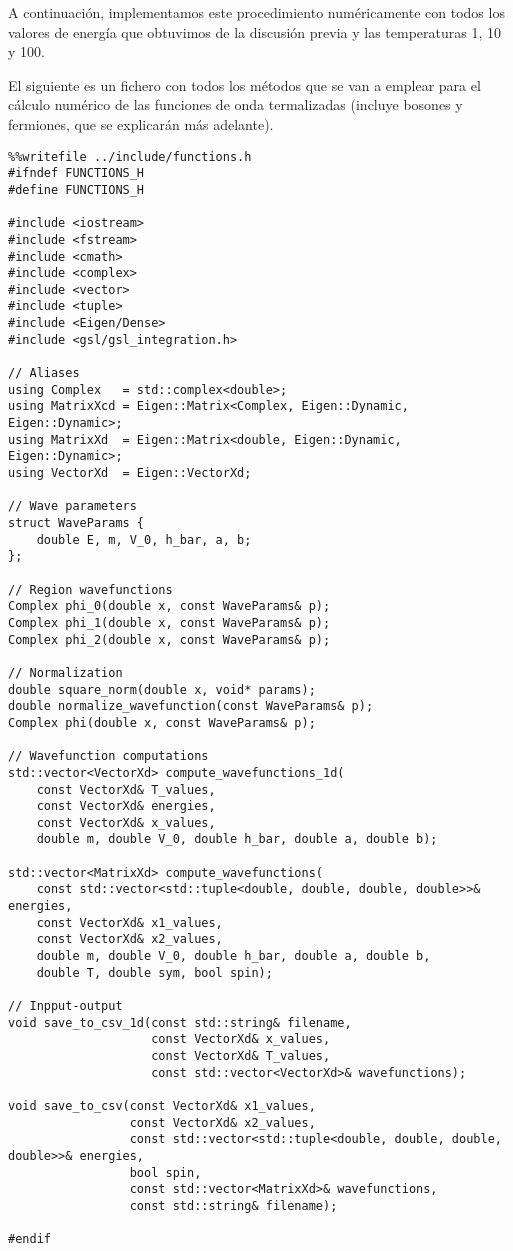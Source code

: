 \documentclass[11pt]{article}
\begin{document}
A continuación, implementamos este procedimiento numéricamente con todos los valores
de energía que obtuvimos de la discusión previa y las temperaturas 1, 10 y 100.

El siguiente es un fichero con todos los métodos que se van a emplear para el cálculo numérico de
las funciones de onda termalizadas (incluye bosones y fermiones, que se
explicarán más adelante).
\begin{verbatim}
%%writefile ../include/functions.h
#ifndef FUNCTIONS_H
#define FUNCTIONS_H

#include <iostream>
#include <fstream>
#include <cmath>
#include <complex>
#include <vector>
#include <tuple>
#include <Eigen/Dense>
#include <gsl/gsl_integration.h>

// Aliases
using Complex   = std::complex<double>;
using MatrixXcd = Eigen::Matrix<Complex, Eigen::Dynamic, Eigen::Dynamic>;
using MatrixXd  = Eigen::Matrix<double, Eigen::Dynamic, Eigen::Dynamic>;
using VectorXd  = Eigen::VectorXd;

// Wave parameters
struct WaveParams {
    double E, m, V_0, h_bar, a, b;
};

// Region wavefunctions
Complex phi_0(double x, const WaveParams& p);
Complex phi_1(double x, const WaveParams& p);
Complex phi_2(double x, const WaveParams& p);

// Normalization
double square_norm(double x, void* params);
double normalize_wavefunction(const WaveParams& p);
Complex phi(double x, const WaveParams& p);

// Wavefunction computations
std::vector<VectorXd> compute_wavefunctions_1d(
    const VectorXd& T_values,
    const VectorXd& energies,
    const VectorXd& x_values,
    double m, double V_0, double h_bar, double a, double b);

std::vector<MatrixXd> compute_wavefunctions(
    const std::vector<std::tuple<double, double, double, double>>& energies,
    const VectorXd& x1_values,
    const VectorXd& x2_values,
    double m, double V_0, double h_bar, double a, double b,
    double T, double sym, bool spin);

// Inpput-output
void save_to_csv_1d(const std::string& filename,
                    const VectorXd& x_values,
                    const VectorXd& T_values,
                    const std::vector<VectorXd>& wavefunctions);

void save_to_csv(const VectorXd& x1_values,
                 const VectorXd& x2_values,
                 const std::vector<std::tuple<double, double, double, double>>& energies,
                 bool spin,
                 const std::vector<MatrixXd>& wavefunctions,
                 const std::string& filename);

#endif
\end{verbatim}
\end{document}
